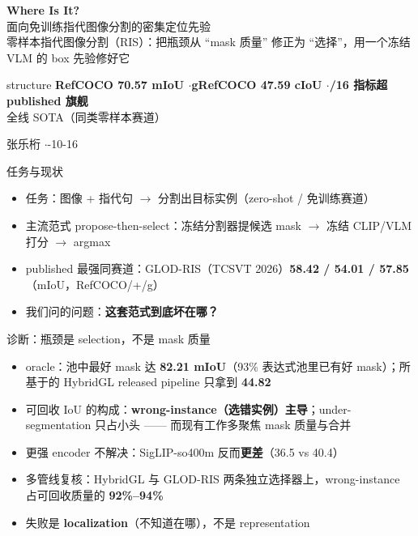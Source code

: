 \documentclass[aspectratio=169,12pt]{beamer}
\begin{document}
\begin{frame}
\centering
\vspace{0.6em}
{\LARGE\bfseries\color{primary} Where Is It?}\\[0.35em]
{\large\color{ink} 面向免训练指代图像分割的密集定位先验}\\[0.8em]
{\small\color{muted} 零样本指代图像分割（RIS）：把瓶颈从 ``mask 质量'' 修正为 ``选择''，用一个冻结 VLM 的 box 先验修好它}\\[1.0em]
\begin{beamercolorbox}[rounded=true,sep=0.6em,wd=0.86\textwidth,center]{structure}
{\small\bfseries RefCOCO 70.57 mIoU \quad$\cdot$\quad gRefCOCO 47.59 cIoU \quad$\cdot$/16 指标超 published 旗舰}\\[0.15em]
{\footnotesize 全线 SOTA（同类零样本赛道）}
\end{beamercolorbox}
\vspace{0.8em}
{\small 张乐桁 \quad$\cdot$-10-16}
\end{frame}

\begin{frame}{任务与现状}
\begin{itemize}
  \item 任务：图像 + 指代句 $\rightarrow$ 分割出目标实例（zero-shot / 免训练赛道）
  \item 主流范式 propose-then-select：冻结分割器提候选 mask $\rightarrow$ 冻结 CLIP/VLM 打分 $\rightarrow$ argmax
  \item published 最强同赛道：GLOD-RIS（TCSVT 2026）\quad \textbf{58.42 / 54.01 / 57.85}（mIoU，RefCOCO/+/g）
  \item 我们问的问题：\textbf{这套范式到底坏在哪？}
\end{itemize}
\end{frame}

\begin{frame}{诊断：瓶颈是 selection，不是 mask 质量}
\begin{itemize}
  \item oracle：池中最好 mask 达 \textbf{82.21 mIoU}（93\% 表达式池里已有好 mask）；所基于的 HybridGL released pipeline 只拿到 \textbf{44.82}
  \item 可回收 IoU 的构成：\textbf{wrong-instance（选错实例）主导}；under-segmentation 只占小头 —— 而现有工作多聚焦 mask 质量与合并
  \item 更强 encoder 不解决：SigLIP-so400m 反而\textbf{更差}（36.5 vs 40.4）
  \item 多管线复核：HybridGL 与 GLOD-RIS 两条独立选择器上，wrong-instance 占可回收质量的 \textbf{92\%--94\%}
  \item[$\Rightarrow$] 失败是 \textbf{localization}（不知道在哪），不是 representation
\end{itemize}
\end{frame}
\end{document}
